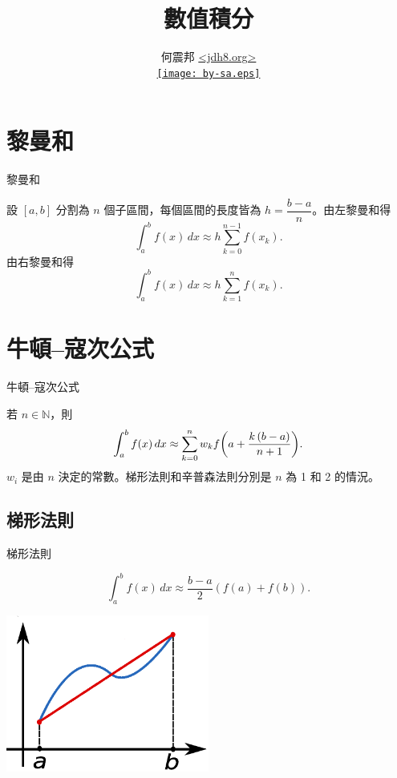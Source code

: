 \documentclass{beamer}
\title{數值積分}
\author[何震邦]{何震邦 \href{http://jdh8.org/}{\textless jdh8.org\textgreater}\\
    \href{http://creativecommons.org/licenses/by-sa/3.0/tw/deed.zh\textunderscore TW}{\texttt{[image: by-sa.eps]}}}
\newcommand{\Left} {\mathopen{}\mathclose\bgroup\left}
\newcommand{\Right}{\aftergroup\egroup\right}
\newcommand{\NN}{\mathbb N}
\theoremstyle{remark}
\begin{document}
\begin{CJK}{UTF8}{bsmi}
\maketitle

\section{黎曼和}
\begin{frame}{黎曼和}
  \begin{theorem}
    設 $[a,b]$ 分割為 $n$ 個子區間，每個區間的長度皆為 $h = \dfrac{b-a}{n}$。由左黎曼和得
    \[\int_a^b f(x)\,dx \approx h \sum_{k=0}^{n-1} f(x_k).\]
    由右黎曼和得
    \[\int_a^b f(x)\,dx \approx h \sum_{k=1}^{n} f(x_k).\]
  \end{theorem}
\end{frame}

\section{牛頓--寇次公式}
\begin{frame}{牛頓--寇次公式}
  \begin{theorem}
    若 $n \in \NN$，則
    \[\int_a^b f(x)\,dx \approx \sum_{k=0}^n w_k f \Left( a + \frac{k \left( b-a \right)}{n+1} \Right).\]
    $w_i$ 是由 $n$ 決定的常數。梯形法則和辛普森法則分別是 $n$ 為 1 和 2 的情況。
  \end{theorem}
\end{frame}

\subsection{梯形法則}
\begin{frame}{梯形法則}
  \begin{theorem}
    \[\int_a^b f(x)\,dx \approx \frac{b-a}{2} \left( f(a) + f(b) \right).\]
  \end{theorem}
  \begin{center}
    \includegraphics[width=0.5\textwidth]{Trapezoidal_rule_illustration}
  \end{center}
\end{frame}


\end{CJK}
\end{document}
